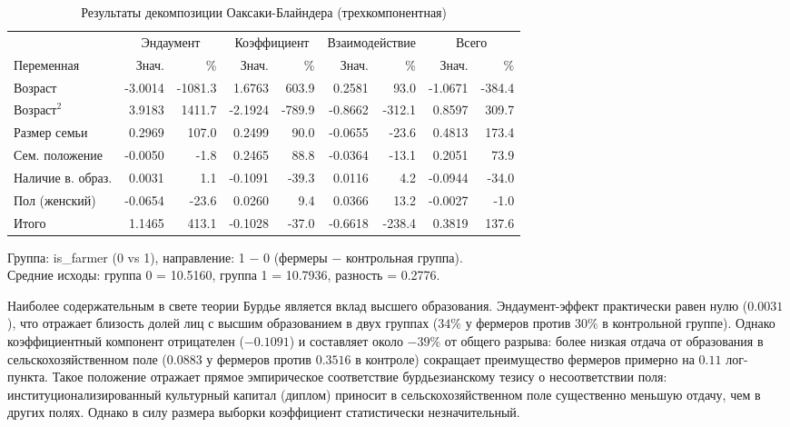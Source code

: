 \documentclass[14pt, a4paper]{article}
\begin{document}
	\begin{table}[H]
		\caption{Результаты декомпозиции Оаксаки-Блайндера (трехкомпонентная)}
		\label{tab:oaxaca_blinder}
		\begin{center}
			\begin{tabular}{lrrrrrrrr}
				\toprule\toprule
				& \multicolumn{2}{c}{Эндаумент} & \multicolumn{2}{c}{Коэффициент} & \multicolumn{2}{c}{Взаимодействие} & \multicolumn{2}{c}{Всего} \\
				\cmidrule(lr){2-3}\cmidrule(lr){4-5}\cmidrule(lr){6-7}\cmidrule(lr){8-9}
				Переменная & Знач. & \% & Знач. & \% & Знач. & \% & Знач. & \% \\
				\midrule
				Возраст                  & -3.0014 & -1081.3 &  1.6763 &  603.9 &  0.2581 &   93.0 & -1.0671 & -384.4 \\
				$\mathrm{Возраст}^{2}$   &  3.9183 &  1411.7 & -2.1924 & -789.9 & -0.8662 & -312.1 &  0.8597 &  309.7 \\
				Размер семьи             &  0.2969 &   107.0 &  0.2499 &   90.0 & -0.0655 &  -23.6 &  0.4813 &  173.4 \\
				Сем. положение           & -0.0050 &    -1.8 &  0.2465 &   88.8 & -0.0364 &  -13.1 &  0.2051 &   73.9 \\
				Наличие в. образ.        &  0.0031 &     1.1 & -0.1091 &  -39.3 &  0.0116 &    4.2 & -0.0944 &  -34.0 \\
				Пол (женский)            & -0.0654 &   -23.6 &  0.0260 &    9.4 &  0.0366 &   13.2 & -0.0027 &   -1.0 \\
				\midrule
				Итого                    &  1.1465 &   413.1 & -0.1028 &  -37.0 & -0.6618 & -238.4 &  0.3819 &  137.6 \\
				\bottomrule
			\end{tabular}
		\end{center}
		
		\vspace{0.5em}
		\footnotesize
		Группа: is\_farmer (0 vs 1), направление: 1 $-$ 0 (фермеры $-$ контрольная группа).\\
		Средние исходы: группа 0 = 10.5160, группа 1 = 10.7936, разность = 0.2776.
	\end{table}
	
	Наиболее содержательным в свете теории Бурдье является вклад высшего образования. Эндаумент-эффект практически равен нулю (\(0.0031\)), что отражает близость долей лиц с высшим образованием в двух группах (\(34\%\) у фермеров против \(30\%\) в контрольной группе). Однако коэффициентный компонент отрицателен (\(-0.1091\)) и составляет около \(-39\%\) от общего разрыва: более низкая отдача от образования в сельскохозяйственном поле (\(0.0883\) у фермеров против \(0.3516\) в контроле) сокращает преимущество фермеров примерно на \(0.11\) лог-пункта. Такое положение отражает прямое эмпирическое соответствие бурдьезианскому тезису о несоответствии поля: институционализированный культурный капитал (диплом) приносит в сельскохозяйственном поле существенно меньшую отдачу, чем в других полях. Однако в силу размера выборки коэффициент статистически незначительный.
	
\end{document}
